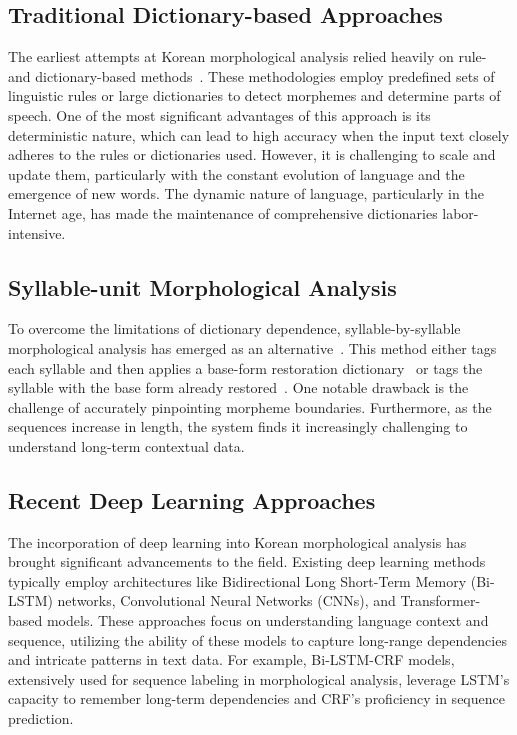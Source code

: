 \documentclass[AMS,STIX2COL]{WileyNJD-v2}
\begin{document}
    \subsection{Traditional Dictionary-based Approaches}\label{subsec:traditional-dictionary-based-approaches}
    The earliest attempts at Korean morphological analysis relied heavily on rule- and dictionary-based methods~\cite{KwonHC1991}.
    These methodologies employ predefined sets of linguistic rules or large dictionaries to detect morphemes and determine parts of speech.
    One of the most significant advantages of this approach is its deterministic nature, which can lead to high accuracy when the input text closely adheres to the rules or dictionaries used.
    However, it is challenging to scale and update them, particularly with the constant evolution of language and the emergence of new words.
    The dynamic nature of language, particularly in the Internet age, has made the maintenance of comprehensive dictionaries labor-intensive.

    \subsection{Syllable-unit Morphological Analysis}\label{subsec:syllable-unit-morphological-analysis}
    To overcome the limitations of dictionary dependence, syllable-by-syllable morphological analysis has emerged as an alternative~\cite{ShimKS2011, LeeCK2013, LeeCH2016, KimHM2016, Li2017, KimSW2018, ChoiYS2018, MinJW2019, KimHM2019, SongHJ2019, SongHJ2020, YounJY2021, ShinHJ2023}.
    This method either tags each syllable and then applies a base-form restoration dictionary~\cite{ShimKS2011, LeeCH2016} or tags the syllable with the base form already restored~\cite{YounJY2021}.
    One notable drawback is the challenge of accurately pinpointing morpheme boundaries.
    Furthermore, as the sequences increase in length, the system finds it increasingly challenging to understand long-term contextual data.

    \subsection{Recent Deep Learning Approaches}\label{subsec:recent-deep-learning-approaches}
    The incorporation of deep learning into Korean morphological analysis has brought significant advancements to the field.
    Existing deep learning methods typically employ architectures like Bidirectional Long Short-Term Memory (Bi-LSTM) networks, Convolutional Neural Networks (CNNs), and Transformer-based models.
    These approaches focus on understanding language context and sequence, utilizing the ability of these models to capture long-range dependencies and intricate patterns in text data.
    For example, Bi-LSTM-CRF models, extensively used for sequence labeling in morphological analysis, leverage LSTM's capacity to remember long-term dependencies and CRF's proficiency in sequence prediction.
\end{document}
